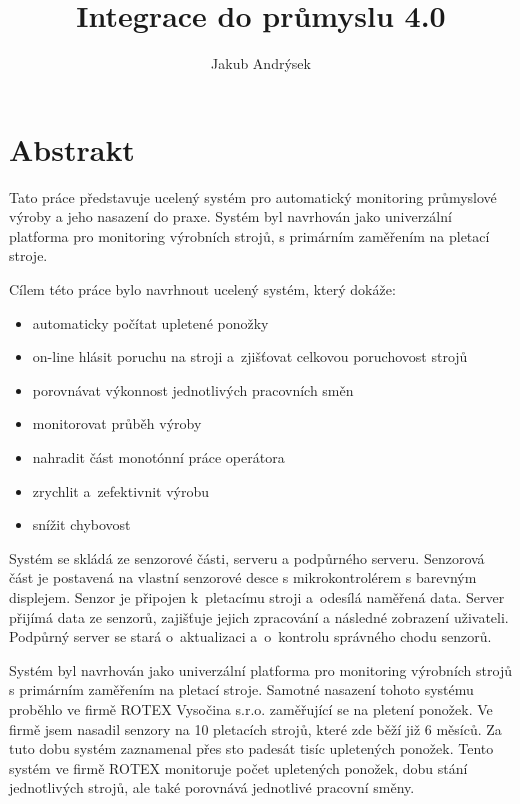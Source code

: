 \documentclass[12pt, a4paper]{article}
\title{Integrace do průmyslu 4.0}
\author{Jakub Andrýsek}
\date{}
\begin{document}

\maketitle

\section*{Abstrakt}
Tato práce představuje ucelený systém pro automatický monitoring průmyslové výroby a jeho nasazení do praxe.
Systém byl navrhován jako univerzální platforma pro monitoring výrobních strojů, s primárním zaměřením na pletací stroje.

Cílem této práce bylo navrhnout ucelený systém, který dokáže:

\begin{itemize}
    \item automaticky počítat upletené ponožky
    \item on-line hlásit poruchu na stroji a~zjišťovat celkovou poruchovost strojů
    \item porovnávat výkonnost jednotlivých pracovních směn
    \item monitorovat průběh výroby
    \item nahradit část monotónní práce operátora
    \item zrychlit a~zefektivnit výrobu
    \item snížit chybovost
\end{itemize}

Systém se skládá ze senzorové části, serveru a podpůrného serveru.
Senzorová část je postavená na vlastní senzorové desce s mikrokontrolérem s barevným displejem. Senzor je připojen k~pletacímu stroji a~odesílá naměřená data.
Server přijímá  data ze senzorů, zajišťuje jejich zpracování a následné zobrazení uživateli.
Podpůrný server se stará o~aktualizaci a~o~kontrolu správného chodu senzorů.

Systém byl navrhován jako univerzální platforma pro monitoring výrobních strojů s primárním zaměřením na pletací stroje. 
Samotné nasazení tohoto systému proběhlo ve firmě ROTEX Vysočina s.r.o. zaměřující se na pletení ponožek. 
Ve firmě jsem nasadil senzory na 10 pletacích strojů, které zde běží již 6 měsíců. 
Za tuto dobu systém zaznamenal přes sto padesát tisíc upletených ponožek.
Tento systém ve firmě ROTEX monitoruje počet upletených ponožek, dobu stání jednotlivých strojů, ale také porovnává jednotlivé pracovní směny.
\end{document}
